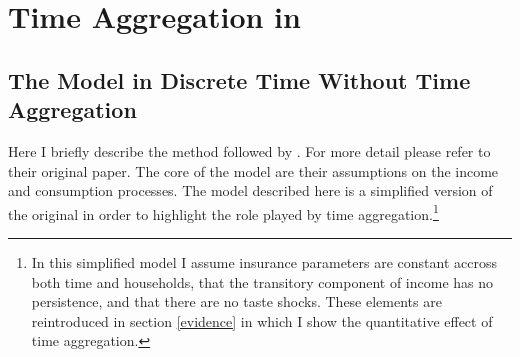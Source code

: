 \documentclass[AER]{AEA}
\begin{document}
\section{Time Aggregation in \cite{blundell_consumption_2008}} \label{BPP}

\subsection{The Model in Discrete Time Without Time Aggregation}
Here I briefly describe the method followed by \cite{blundell_consumption_2008}. For more detail please refer to their original paper. The core of the model are their assumptions on the income and consumption processes. The model described here is a simplified version of the original in order to highlight the role played by time aggregation.\footnote{In this simplified model I assume insurance parameters are constant accross both time and households, that the transitory component of income has no persistence, and that there are no taste shocks. These elements are reintroduced in section \ref{evidence} in which I show the quantitative effect of time aggregation.} 
\end{document}
